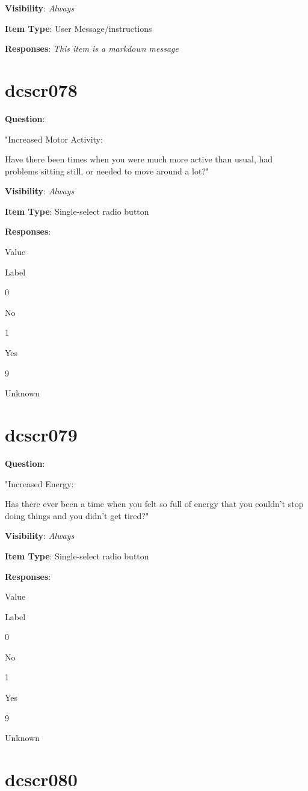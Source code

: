 \documentclass[]{book}
\begin{document}
\textbf{Visibility}: \emph{Always}

\textbf{Item Type}: User Message/instructions

\textbf{Responses}: \emph{This item is a markdown message}

\hypertarget{dcscr078}{%
\section{dcscr078}\label{dcscr078}}

\textbf{Question}:

"Increased Motor Activity:

Have there been times when you were much more active than usual, had problems sitting still, or needed to move around a lot?"

\textbf{Visibility}: \emph{Always}

\textbf{Item Type}: Single-select radio button

\textbf{Responses}:

Value

Label

0

No

1

Yes

9

Unknown

\hypertarget{dcscr079}{%
\section{dcscr079}\label{dcscr079}}

\textbf{Question}:

"Increased Energy:

Has there ever been a time when you felt so full of energy that you couldn't stop doing things and you didn't get tired?"

\textbf{Visibility}: \emph{Always}

\textbf{Item Type}: Single-select radio button

\textbf{Responses}:

Value

Label

0

No

1

Yes

9

Unknown

\hypertarget{dcscr080}{%
\section{dcscr080}\label{dcscr080}}
\end{document}
